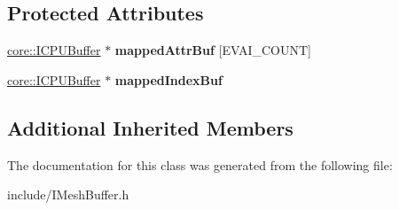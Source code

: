 \subsection*{Protected Attributes}
\begin{DoxyCompactItemize}
\item 
\hyperlink{classirr_1_1core_1_1ICPUBuffer}{core\+::\+I\+C\+P\+U\+Buffer} $\ast$ {\bfseries mapped\+Attr\+Buf} \mbox{[}E\+V\+A\+I\+\_\+\+C\+O\+U\+NT\mbox{]}\hypertarget{classirr_1_1scene_1_1ICPUMeshDataFormatDesc_ad7374aa5c82fb16c0dcfdf2bb06b8da0}{}\label{classirr_1_1scene_1_1ICPUMeshDataFormatDesc_ad7374aa5c82fb16c0dcfdf2bb06b8da0}

\item 
\hyperlink{classirr_1_1core_1_1ICPUBuffer}{core\+::\+I\+C\+P\+U\+Buffer} $\ast$ {\bfseries mapped\+Index\+Buf}\hypertarget{classirr_1_1scene_1_1ICPUMeshDataFormatDesc_adb80af396a0546ef695d28c376ea7224}{}\label{classirr_1_1scene_1_1ICPUMeshDataFormatDesc_adb80af396a0546ef695d28c376ea7224}

\end{DoxyCompactItemize}
\subsection*{Additional Inherited Members}


The documentation for this class was generated from the following file\+:\begin{DoxyCompactItemize}
\item 
include/I\+Mesh\+Buffer.\+h\end{DoxyCompactItemize}
